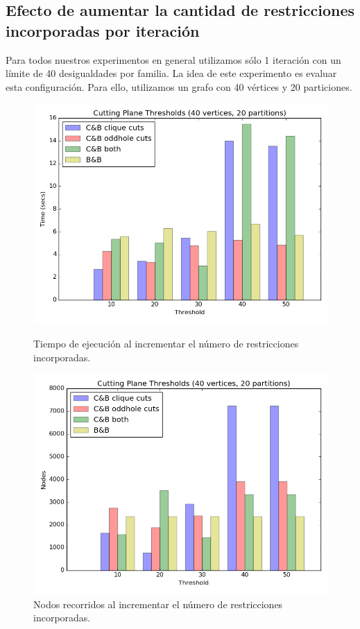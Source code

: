 \pagebreak

\subsection{Efecto de aumentar la cantidad de restricciones incorporadas por iteración}

Para todos nuestros experimentos en general utilizamos sólo 1 iteración con un límite de 40 desigualdades por familia. La idea de este experimento es evaluar esta configuración. Para ello, utilizamos un grafo con 40 vértices y 20 particiones.

\begin{figure}[h]
  \centering
  \begin{minipage}[b]{0.49\textwidth}
    \includegraphics[width=\textwidth]{img/6-thresholds_v40_p20_i1_t1_b0.png}
    \caption{Tiempo de ejecución al incrementar el número de restricciones incorporadas.}
  \end{minipage}
  \hfill
  \begin{minipage}[b]{0.49\textwidth}
    \includegraphics[width=\textwidth]{img/6-thresholds_v40_p20_i1_co2_t1_b0_nodes.png}
    \caption{Nodos recorridos al incrementar el número de restricciones incorporadas.}
  \end{minipage}
\end{figure}

